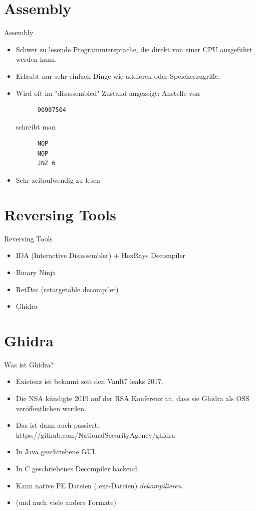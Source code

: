 \documentclass[aspectratio=169,handout]{beamer}
\begin{document}
\section{Assembly}
\begin{frame}[fragile]{Assembly}\pause
  \begin{itemize}
    \item Schwer zu lesende Programmiersprache, die direkt von einer CPU ausgeführt werden kann.\pause
    \item Erlaubt nur sehr einfach Dinge wie addieren oder Speicherzugriffe.\pause
    \item Wird oft im "disassembled" Zustand angezeigt\pause: Anstelle von
    \begin{verbatim}
      90907504
    \end{verbatim}
    \pause schreibt man
    \begin{lstlisting}
      NOP
      NOP
      JNZ 6
    \end{lstlisting}\pause
    \item Sehr zeitaufwendig zu lesen
  \end{itemize}
\end{frame}

\section{Reversing Tools}
\begin{frame}{Reversing Tools}\pause
  \begin{itemize}
    \item IDA \pause (Interactive Disassembler) \pause + HexRays Decompiler\pause
    \item Binary Ninja\pause
    \item RetDec \pause (retargetable decompiler)\pause
    \item Ghidra
  \end{itemize}
\end{frame}

\section{Ghidra}
\begin{frame}{Was ist Ghidra?}
  \begin{itemize}
    \item Existenz ist bekannt seit den Vault7 leaks 2017.\pause
    \item Die NSA kündigte 2019 auf der RSA Konferenz an, dass sie Ghidra als OSS veröffentlichen werden.\pause
    \item Das ist dann auch passiert: https://github.com/NationalSecurityAgency/ghidra\pause
    \item In Java geschriebene GUI.\pause
    \item In C geschriebenes Decompiler backend.\pause
    \item Kann native PE Dateien (.exe-Dateien) \emph{dekompilieren}\pause
    \item (und auch viele andere Formate)
  \end{itemize}
\end{frame}
\end{document}
